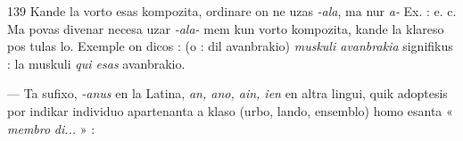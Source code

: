 \begin{VUpage}[143]{139}
Kande la vorto esas kompozita, ordinare on ne uzas \textit{-ala},\nl
ma nur \textit{a-} Ex. : \cc
{}\nl
{} e. c. Ma povas divenar necesa\nl
uzar \textit{-ala-} mem kun vorto kompozita, kande la klareso pos\cc
tulas lo. Exemple on dicos :  (o :\nl
dil avanbrakio)  \textit{muskuli avanbrakia} signifikus : la\nl
muskuli \textit{qui esas} avanbrakio.

 --- Ta sufixo, \textit{-anus} en la Latina, \textit{an, ano, ain, ien} en\nl
altra lingui, quik adoptesis por indikar individuo apartenanta\nl
a klaso (urbo, lando, ensemblo) homo esanta « \textit{membro}\nl
\textit{di...} » : \parplein
\end{VUpage}

